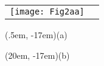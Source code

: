 \documentclass[varwidth=36em]{standalone}
\begin{document}
	\begin{tabular}[c]{p{20em}p{55em}}
		\shortstack[c]{
			\texttt{[image: Fig2aa]}\\[0.0cm]}%
		& 
		\shortstack[c]{
			\texttt{[image: Fig2bb]}}%
	\end{tabular}
	\begin{textblock*}{5em}(.5em, -17em)\sf (a)\end{textblock*}
	\begin{textblock*}{5em}(20em, -17em)\sf (b)\end{textblock*}
\end{document}

